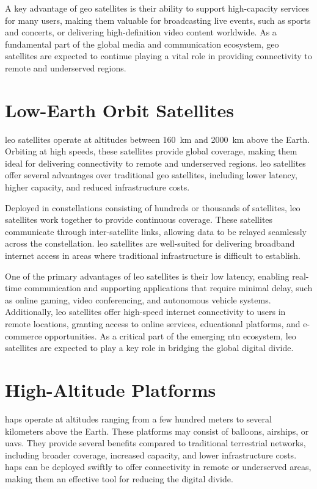 A key advantage of \gls{geo} satellites is their ability to support high-capacity services for many users, making them valuable for broadcasting live events, such as sports and concerts, or delivering high-definition video content worldwide. As a fundamental part of the global media and communication ecosystem, \gls{geo} satellites are expected to continue playing a vital role in providing connectivity to remote and underserved regions.

\section{Low-Earth Orbit Satellites}

\gls{leo} satellites operate at altitudes between \SI{160}{\kilo\meter} and \SI{2000}{\kilo\meter} above the Earth. Orbiting at high speeds, these satellites provide global coverage, making them ideal for delivering connectivity to remote and underserved regions. \gls{leo} satellites offer several advantages over traditional \gls{geo} satellites, including lower latency, higher capacity, and reduced infrastructure costs.

Deployed in constellations consisting of hundreds or thousands of satellites, \gls{leo} satellites work together to provide continuous coverage. These satellites communicate through inter-satellite links, allowing data to be relayed seamlessly across the constellation. \gls{leo} satellites are well-suited for delivering broadband internet access in areas where traditional infrastructure is difficult to establish.

One of the primary advantages of \gls{leo} satellites is their low latency, enabling real-time communication and supporting applications that require minimal delay, such as online gaming, video conferencing, and autonomous vehicle systems. Additionally, \gls{leo} satellites offer high-speed internet connectivity to users in remote locations, granting access to online services, educational platforms, and e-commerce opportunities. As a critical part of the emerging \gls{ntn} ecosystem, \gls{leo} satellites are expected to play a key role in bridging the global digital divide.

\section{High-Altitude Platforms}

\glspl{hap} operate at altitudes ranging from a few hundred meters to several kilometers above the Earth. These platforms may consist of balloons, airships, or \glspl{uav}. They provide several benefits compared to traditional terrestrial networks, including broader coverage, increased capacity, and lower infrastructure costs. \glspl{hap} can be deployed swiftly to offer connectivity in remote or underserved areas, making them an effective tool for reducing the digital divide.

